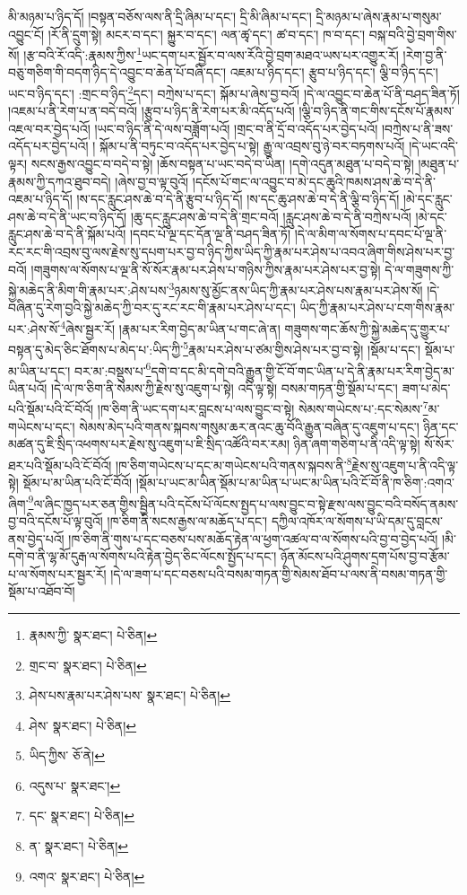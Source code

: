 མི་མཉམ་པ་ཉིད་དོ། །བསྟན་བཅོས་ལས་ནི་དྲི་ཞིམ་པ་དང་། དྲི་མི་ཞིམ་པ་དང་། དྲི་མཉམ་པ་ཞེས་རྣམ་པ་གསུམ་འབྱུང་ངོ། །རོ་ནི་དྲུག་སྟེ། མངར་བ་དང་། སྐྱུར་བ་དང་། ལན་ཚྭ་དང་། ཚ་བ་དང་། ཁ་བ་དང་། བསྐ་བའི་བྱེ་བྲག་གིས་སོ། །རྩ་བའི་རོ་འདི་:རྣམས་ཀྱིས་\footnote{རྣམས་ཀྱི་  སྣར་ཐང་།  པེ་ཅིན། }ཡང་དག་པར་སྦྱོར་བ་ལས་རོའི་བྱེ་བྲག་མཐའ་ཡས་པར་འགྱུར་རོ། །རེག་བྱ་ནི་བཅུ་གཅིག་གི་བདག་ཉིད་དེ་འབྱུང་བ་ཆེན་པོ་བཞི་དང་། འཇམ་པ་ཉིད་དང་། རྩུབ་པ་ཉིད་དང་། ལྕི་བ་ཉིད་དང་། ཡང་བ་ཉིད་དང་། :གྲང་བ་ཉིད་\footnote{གྲང་བ་  སྣར་ཐང་།  པེ་ཅིན། }དང་། བཀྲེས་པ་དང་། སྐོམ་པ་ཞེས་བྱ་བའོ། །དེ་ལ་འབྱུང་བ་ཆེན་པོ་ནི་བཤད་ཟིན་ཏོ། །འཇམ་པ་ནི་རེག་པ་ན་བདེ་བའོ། །རྩུབ་པ་ཉིད་ནི་རེག་པར་མི་འདོད་པའོ། །ལྕི་བ་ཉིད་ནི་གང་གིས་དངོས་པོ་རྣམས་འཇལ་བར་བྱེད་པའོ། །ཡང་བ་ཉིད་ནི་དེ་ལས་བཟློག་པའོ། །གྲང་བ་ནི་དྲོ་བ་འདོད་པར་བྱེད་པའོ། །བཀྲེས་པ་ནི་ཟས་འདོད་པར་བྱེད་པའོ། །
སྐོམ་པ་ནི་བཏུང་བ་འདོད་པར་བྱེད་པ་སྟེ། རྒྱུ་ལ་འབྲས་བུ་ཉེ་བར་བཏགས་པའོ། །དེ་ཡང་འདི་ལྟར། སངས་རྒྱས་འབྱུང་བ་བདེ་བ་སྟེ། །ཆོས་བསྟན་པ་ཡང་བདེ་བ་ཡིན། །དགེ་འདུན་མཐུན་པ་བདེ་བ་སྟེ། །མཐུན་པ་རྣམས་ཀྱི་དཀའ་ཐུབ་བདེ། །ཞེས་བྱ་བ་ལྟ་བུའོ། །དངོས་པོ་གང་ལ་འབྱུང་བ་མེ་དང་ཆུའི་ཁམས་ཤས་ཆེ་བ་དེ་ནི་འཇམ་པ་ཉིད་དོ། །ས་དང་རླུང་ཤས་ཆེ་བ་དེ་ནི་རྩུབ་པ་ཉིད་དོ། །ས་དང་ཆུ་ཤས་ཆེ་བ་དེ་ནི་ལྕི་བ་ཉིད་དོ། །མེ་དང་རླུང་ཤས་ཆེ་བ་དེ་ནི་ཡང་བ་ཉིད་དོ། །ཆུ་དང་རླུང་ཤས་ཆེ་བ་དེ་ནི་གྲང་བའོ། །རླུང་ཤས་ཆེ་བ་དེ་ནི་བཀྲེས་པའོ། །མེ་དང་རླུང་ཤས་ཆེ་བ་དེ་ནི་སྐོམ་པའོ། །དབང་པོ་ལྔ་དང་དོན་ལྔ་ནི་བཤད་ཟིན་ཏོ། །དེ་ལ་མིག་ལ་སོགས་པ་དབང་པོ་ལྔ་ནི་རང་རང་གི་འབྲས་བུ་ལས་རྗེས་སུ་དཔག་པར་བྱ་བ་ཉིད་ཀྱིས་ཡིད་ཀྱི་རྣམ་པར་ཤེས་པ་འབའ་ཞིག་གིས་ཤེས་པར་བྱ་བའོ། །གཟུགས་ལ་སོགས་པ་ལྔ་ནི་སོ་སོར་རྣམ་པར་ཤེས་པ་གཉིས་ཀྱིས་རྣམ་པར་ཤེས་པར་བྱ་སྟེ། དེ་ལ་གཟུགས་ཀྱི་སྐྱེ་མཆེད་ནི་མིག་གི་རྣམ་པར་:ཤེས་པས་\footnote{ཤེས་པས་རྣམ་པར་ཤེས་པས་  སྣར་ཐང་།  པེ་ཅིན། }ཉམས་སུ་མྱོང་ནས་ཡིད་ཀྱི་རྣམ་པར་ཤེས་པས་རྣམ་པར་ཤེས་སོ། །དེ་བཞིན་དུ་རེག་བྱའི་སྐྱེ་མཆེད་ཀྱི་བར་དུ་རང་རང་གི་རྣམ་པར་ཤེས་པ་དང་། ཡིད་ཀྱི་རྣམ་པར་ཤེས་པ་ངག་གིས་རྣམ་པར་:ཤེས་སོ་\footnote{ཤེས་  སྣར་ཐང་།  པེ་ཅིན། }ཞེས་སྦྱར་རོ། །རྣམ་པར་རིག་བྱེད་མ་ཡིན་པ་གང་ཞེ་ན། གཟུགས་གང་ཆོས་ཀྱི་སྐྱེ་མཆེད་དུ་གྱུར་པ་བསྟན་དུ་མེད་ཅིང་ཐོགས་པ་མེད་པ་:ཡིད་ཀྱི་\footnote{ཡིད་ཀྱིས་  ཅོ་ནེ། }རྣམ་པར་ཤེས་པ་ཙམ་གྱིས་ཤེས་པར་བྱ་བ་སྟེ། །སྡོམ་པ་དང་། སྡོམ་པ་མ་ཡིན་པ་དང་། བར་མ་:བསྡུས་པ་\footnote{འདུས་པ་  སྣར་ཐང་། }དགེ་བ་དང་མི་དགེ་བའི་རྒྱུན་གྱི་ངོ་བོ་གང་ཡིན་པ་དེ་ནི་རྣམ་པར་རིག་བྱེད་མ་ཡིན་པའོ། །དེ་ལ་ཁ་ཅིག་ནི་སེམས་ཀྱི་རྗེས་སུ་འཇུག་པ་སྟེ། འདི་ལྟ་སྟེ། བསམ་གཏན་གྱི་སྡོམ་པ་དང་། ཟག་པ་མེད་པའི་སྡོམ་པའི་ངོ་བོའོ། །ཁ་ཅིག་ནི་ཡང་དག་པར་བླངས་པ་ལས་བྱུང་བ་སྟེ། སེམས་གཡེངས་པ་:དང་སེམས་\footnote{དང་  སྣར་ཐང་།  པེ་ཅིན། }མ་གཡེངས་པ་དང་། སེམས་མེད་པའི་གནས་སྐབས་གསུམ་ཆར་ནའང་ཆུ་བོའི་རྒྱུན་བཞིན་དུ་འཇུག་པ་དང་། ཉིན་དང་མཚན་དུ་ཇི་སྲིད་འཕགས་པར་རྗེས་སུ་འཇུག་པ་ཇི་སྲིད་འཚོའི་བར་རམ། ཉིན་ཞག་གཅིག་པ་ནི་འདི་ལྟ་སྟེ། སོ་སོར་ཐར་པའི་སྡོམ་པའི་ངོ་བོའོ། །ཁ་ཅིག་གཡེངས་པ་དང་མ་གཡེངས་པའི་གནས་སྐབས་ནི་\footnote{ན་  སྣར་ཐང་།  པེ་ཅིན། }རྗེས་སུ་འཇུག་པ་ནི་འདི་ལྟ་སྟེ། སྡོམ་པ་མ་ཡིན་པའི་ངོ་བོའོ། །སྡོམ་པ་ཡང་མ་ཡིན་སྡོམ་པ་མ་ཡིན་པ་ཡང་མ་ཡིན་པའི་ངོ་བོ་ནི་ཁ་ཅིག་:འགའ་ཞིག་\footnote{འགའ་  སྣར་ཐང་།  པེ་ཅིན། }ལ་ཞིང་ཁྱད་པར་ཅན་གྱིས་སྦྱིན་པའི་དངོས་པོ་ལོངས་སྤྱད་པ་ལས་བྱུང་བ་སྟེ་རྫས་ལས་བྱུང་བའི་བསོད་ནམས་བྱ་བའི་དངོས་པོ་ལྟ་བུའོ། །ཁ་ཅིག་ནི་སངས་རྒྱས་ལ་མཆོད་པ་དང་། དཀྱིལ་འཁོར་ལ་སོགས་པ་ཡི་དམ་དུ་བླངས་ནས་བྱེད་པའོ། །ཁ་ཅིག་ནི་གུས་པ་དང་བཅས་པས་མཆོད་རྟེན་ལ་ཕྱག་འཚལ་བ་ལ་སོགས་པའི་བྱ་བ་བྱེད་པའོ། །མི་དགེ་བ་ནི་ལྷ་མོ་དུརྒ་ལ་སོགས་པའི་རྟེན་བྱེད་ཅིང་ལོངས་སྤྱོད་པ་དང་། ཉོན་མོངས་པའི་ཤུགས་དྲག་པོས་བྱ་བ་རྩོམ་པ་ལ་སོགས་པར་སྦྱར་རོ། །དེ་ལ་ཟག་པ་དང་བཅས་པའི་བསམ་གཏན་གྱི་སེམས་ཐོབ་པ་ལས་ནི་བསམ་གཏན་གྱི་སྡོམ་པ་འཐོབ་བོ། 